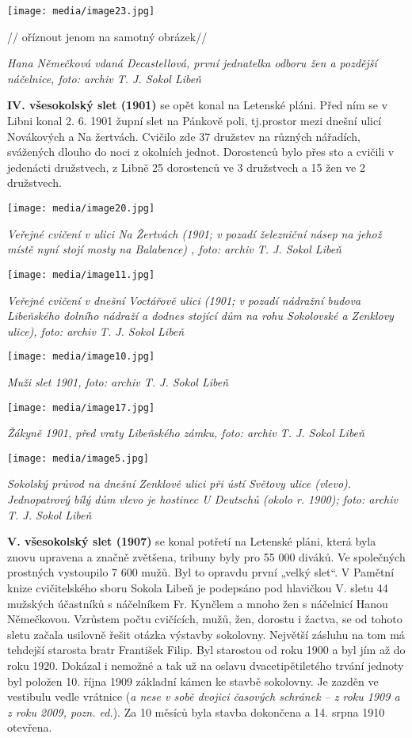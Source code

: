 \texttt{[image: media/image23.jpg]}

// oříznout jenom na samotný obrázek//

\emph{Hana Němečková vdaná Decastellová, první jednatelka odboru žen a
pozdější náčelnice, foto: archiv T. J. Sokol Libeň}

\textbf{IV. všesokolský slet (1901)} se opět konal na Letenské pláni.
Před ním se v Libni konal 2. 6. 1901 župní slet na Pánkově poli,
tj.prostor mezi dnešní ulicí Novákových a Na žertvách. Cvičilo zde 37
družstev na různých nářadích, svážených dlouho do noci z okolních
jednot. Dorostenců bylo přes sto a cvičili v jedenácti družstvech, z
Libně 25 dorostenců ve 3 družstvech a 15 žen ve 2 družstvech.

\texttt{[image: media/image20.jpg]}

\emph{Veřejné cvičení v ulici Na Žertvách (1901; v pozadí železniční
násep na jehož místě nyní stojí mosty na Balabence) , foto: archiv T. J.
Sokol Libeň}

\texttt{[image: media/image11.jpg]}

\emph{Veřejné cvičení v dnešní Voctářově ulici (1901; v pozadí nádražní
budova Libeňského dolního nádraží a dodnes stojící dům na rohu
Sokolovské a Zenklovy ulice), foto: archiv T. J. Sokol Libeň}

\texttt{[image: media/image10.jpg]}

\emph{Muži slet 1901, foto: archiv T. J. Sokol Libeň}

\texttt{[image: media/image17.jpg]}

\emph{Žákyně 1901, před vraty Libeňského zámku, foto: archiv T. J. Sokol
Libeň}

\texttt{[image: media/image5.jpg]}

\emph{Sokolský průvod na dnešní Zenklově ulici při ústí Světovy ulice
(vlevo). Jednopatrový bílý dům vlevo je hostinec U Deutschů (okolo r.
1900); foto: archiv T. J. Sokol Libeň}

\textbf{V. všesokolský slet (1907)} se konal potřetí na Letenské pláni,
která byla znovu upravena a značně zvětšena, tribuny byly pro 55 000
diváků. Ve společných prostných vystoupilo 7 600 mužů. Byl to opravdu
první „velký slet``. V Pamětní knize cvičitelského sboru Sokola Libeň je
podepsáno pod hlavičkou V. sletu 44 mužských účastníků s náčelníkem Fr.
Kynčlem a mnoho žen s náčelnicí Hanou Němečkovou. Vzrůstem počtu
cvičících, mužů, žen, dorostu i žactva, se od tohoto sletu začala
usilovně řešit otázka výstavby sokolovny. Největší zásluhu na tom má
tehdejší starosta bratr František Filip. Byl starostou od roku 1900 a
byl jím až do roku 1920. Dokázal i nemožné a tak už na oslavu
dvacetipětiletého trvání jednoty byl položen 10. října 1909 základní
kámen ke stavbě sokolovny. Je zazděn ve vestibulu vedle vrátnice
(\emph{a nese v sobě dvojici časových schránek -- z roku 1909 a z roku
2009, pozn. ed.}). Za 10 měsíců byla stavba dokončena a 14. srpna 1910
otevřena.


